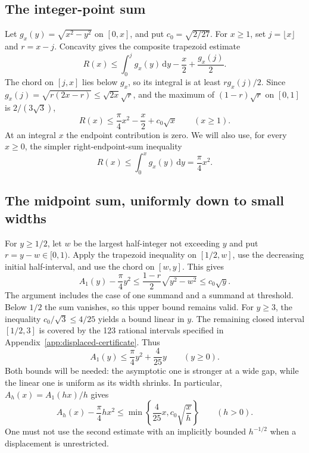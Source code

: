 \documentclass[11pt,reqno]{amsart}
\numberwithin{equation}{section}
\newcommand{\dd}{\,\mathrm d}
\begin{document}
\subsection*{The integer-point sum}

Let $g_x(y)=\sqrt{x^2-y^2}$ on $[0,x]$, and put
$c_0=\sqrt{2/27}$. For $x\ge1$, set $j=\lfloor x\rfloor$
and $r=x-j$. Concavity gives the composite trapezoid estimate
\[
 R(x)\le\int_0^j g_x(y)\dd y-\frac x2+\frac{g_x(j)}2.
\]
The chord on $[j,x]$ lies below $g_x$, so its integral is at
least $r g_x(j)/2$. Since
$g_x(j)=\sqrt{r(2x-r)}\le\sqrt{2x}\sqrt r$, and the maximum
of $(1-r)\sqrt r$ on $[0,1]$ is $2/(3\sqrt3)$,
\begin{equation}\label{eq:R-upper}
 R(x)\le\frac\pi4x^2-\frac x2+c_0\sqrt x
 \qquad(x\ge1).
\end{equation}
At an integral $x$ the endpoint contribution is zero.
We will also use, for every $x\ge0$, the simpler
right-endpoint-sum inequality
\begin{equation}\label{eq:R-integral}
 R(x)\le\int_0^x g_x(y)\dd y=\frac\pi4x^2.
\end{equation}

\subsection*{The midpoint sum, uniformly down to small widths}

For $y\ge1/2$, let $w$ be the largest half-integer not
exceeding $y$ and put $r=y-w\in[0,1)$. Apply the trapezoid
inequality on $[1/2,w]$, use the decreasing initial
half-interval, and use the chord on $[w,y]$. This gives
\[
 A_1(y)-\frac\pi4y^2
 \le\frac{1-r}{2}\sqrt{y^2-w^2}
 \le c_0\sqrt y.
\]
The argument includes the case of one summand and a summand
at threshold. Below $1/2$ the sum vanishes, so this upper
bound remains valid. For $y\ge3$, the inequality
$c_0/\sqrt3\le4/25$ yields a bound linear in $y$.
The remaining closed interval $[1/2,3]$ is covered by the
123 rational intervals specified in
Appendix~\ref{app:displaced-certificate}. Thus
\begin{equation}\label{eq:rect-midpoint}
 A_1(y)\le\frac\pi4y^2+\frac4{25}y
 \qquad(y\ge0).
\end{equation}
Both bounds will be needed: the asymptotic one is stronger
at a wide gap, while the linear one is uniform as its width
shrinks. In particular, $A_h(x)=A_1(hx)/h$ gives
\begin{equation}\label{eq:midpoint-two-bounds}
 A_h(x)-\frac\pi4hx^2
 \le\min\left\{\frac4{25}x,c_0\sqrt{\frac{x}{h}}\right\}
 \qquad(h>0).
\end{equation}
One must not use the second estimate with an implicitly
bounded $h^{-1/2}$ when a displacement is unrestricted.
\end{document}
